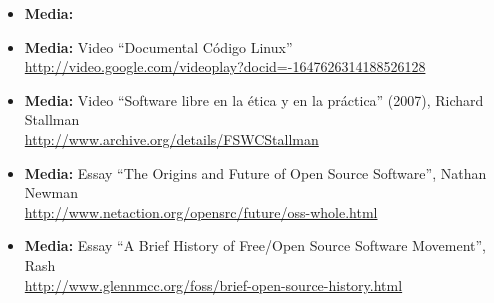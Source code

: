 \documentclass[a4paper]{article}
\begin{document}
\begin{itemize}
\item \textbf{Media:}
\item \textbf{Media:} Video ``Documental Código Linux'' \\
  \url{http://video.google.com/videoplay?docid=-1647626314188526128}

\item \textbf{Media:} Video ``Software libre en la ética y en la práctica'' (2007), Richard Stallman \\
  \url{http://www.archive.org/details/FSWCStallman}
\item \textbf{Media:} Essay ``The Origins and Future of Open Source Software'', Nathan Newman \\
  \url{http://www.netaction.org/opensrc/future/oss-whole.html}
\item \textbf{Media:} Essay ``A Brief History of Free/Open Source Software Movement'', Rash \\
  \url{http://www.glennmcc.org/foss/brief-open-source-history.html}

\end{itemize}



\end{document}
